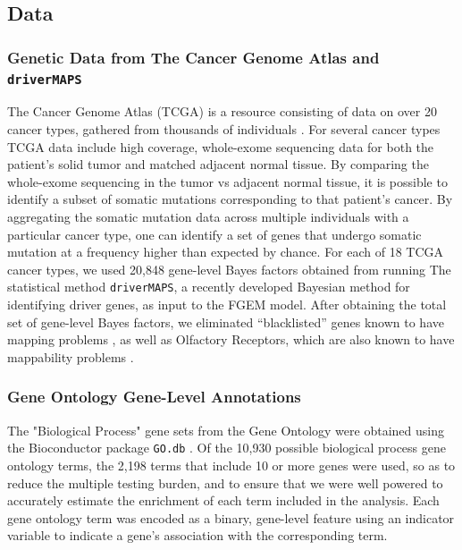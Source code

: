 \subsection{Data}

\subsubsection{Genetic Data from The Cancer Genome Atlas and \texttt{driverMAPS}}\label{sec:org31ff9f1}

The Cancer Genome Atlas (TCGA) is a resource consisting of data on over 20 cancer types, gathered from thousands of individuals \cite{TCGA}.  For several cancer types TCGA data include high coverage, whole-exome sequencing data for both the patient's solid tumor and matched adjacent normal tissue.  By comparing the whole-exome sequencing in the tumor vs adjacent normal tissue, it is possible to identify a subset of somatic mutations corresponding to that patient's cancer.  By aggregating the somatic mutation data across multiple individuals with a particular cancer type, one can identify a set of genes that undergo somatic mutation at a frequency higher than expected by chance.  For each of 18 TCGA cancer types, we used 20,848 gene-level Bayes factors obtained from running The statistical method \texttt{driverMAPS}, a recently developed Bayesian method for identifying driver genes, as  input to the FGEM model.  After obtaining the total set of gene-level Bayes factors, we eliminated ``blacklisted'' genes known to have mapping problems \cite{drivermapsblacklist}, as well as Olfactory Receptors, which are also known to have mappability problems \cite{Derrien_2012}.

\subsubsection{Gene Ontology Gene-Level Annotations}\label{sec:orgd117550}

The "Biological Process" gene sets from the Gene Ontology were obtained using the Bioconductor package \texttt{GO.db} \cite{godb}. Of the 10,930 possible biological process gene ontology terms, the 2,198 terms that 
include 10 or more genes were used, so as to reduce the multiple testing burden, and to ensure that we were well powered to accurately estimate the enrichment of each term included in the analysis.  Each gene ontology term was encoded as a binary, gene-level feature using an indicator variable to indicate a gene's association with the corresponding term. 


